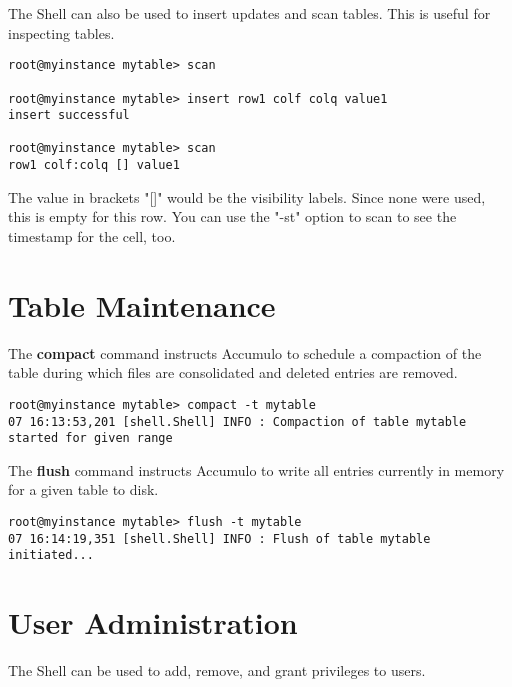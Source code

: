 The Shell can also be used to insert updates and scan tables. This is useful for
inspecting tables.

\small
\begin{verbatim}
root@myinstance mytable> scan

root@myinstance mytable> insert row1 colf colq value1
insert successful

root@myinstance mytable> scan
row1 colf:colq [] value1
\end{verbatim}
\normalsize

The value in brackets "[]" would be the visibility labels. Since none were used, this is empty for this row.
You can use the "-st" option to scan to see the timestamp for the cell, too.

\section{Table Maintenance}

The \textbf{compact} command instructs Accumulo to schedule a compaction of the table during which
files are consolidated and deleted entries are removed.

\small
\begin{verbatim}
root@myinstance mytable> compact -t mytable
07 16:13:53,201 [shell.Shell] INFO : Compaction of table mytable started for given range
\end{verbatim}
\normalsize

The \textbf{flush} command instructs Accumulo to write all entries currently in memory for a given table
to disk.

\small
\begin{verbatim}
root@myinstance mytable> flush -t mytable
07 16:14:19,351 [shell.Shell] INFO : Flush of table mytable
initiated...
\end{verbatim}
\normalsize

\section{User Administration}

The Shell can be used to add, remove, and grant privileges to users.

